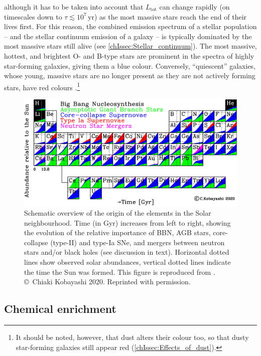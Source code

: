 \noindent although it has to be taken into account that $L_\text{tot}$ can change rapidly (on timescales down to $\tau \lesssim 10^7 \, \mathrm{yr}$) as the most massive stars reach the end of their lives first. For this reason, the combined emission spectrum of a stellar population -- and the stellar continuum emission of a galaxy -- is typically dominated by the most massive stars still alive (see \cref{chIssec:Stellar_continuum}). The most massive, hottest, and brightest O- and B-type stars are prominent in the spectra of highly star-forming galaxies, giving them a blue colour. Conversely, ``quiescent'' galaxies, whose young, massive stars are no longer present as they are not actively forming stars, have red colours \citep{2010ApJ...721..193P}.\footnote{It should be noted, however, that dust alters their colour too, so that dusty star-forming galaxies still appear red (\cref{chIssec:Effects_of_dust}).}
\begin{figure}
    \centering
    \includegraphics[width=\linewidth]{"Figs/Origin_of_elements"}
    \caption[Schematic overview of the origin of the elements in the Solar neighbourhood.]{Schematic overview of the origin of the elements in the Solar neighbourhood. Time (in Gyr) increases from left to right, showing the evolution of the relative importance of BBN, AGB stars, core-collapse (type-II) and type-Ia SNe, and mergers between neutron stars and/or black holes (see discussion in text). Horizontal dotted lines show observed solar abundances, vertical dotted lines indicate the time the Sun was formed. This figure is reproduced from \citet{2020ApJ...900..179K}. \copyright\ Chiaki Kobayashi 2020. Reprinted with permission.}
    \label{chIfig:Elements_origin}
\end{figure}

\subsection{Chemical enrichment}
\label{chIssec:Chemical_enrichment}


